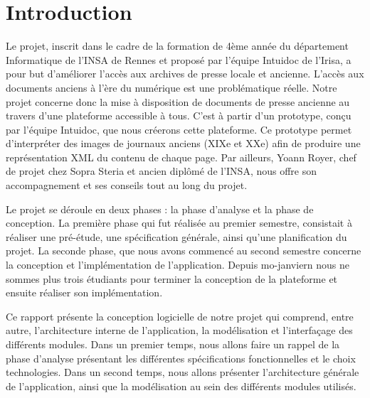 \section{Introduction}
\label{sec:intro}

Le projet, inscrit dans le cadre de la formation de 4ème année du département Informatique de l’INSA de Rennes et proposé par l’équipe Intuidoc de l’Irisa, a pour but d’améliorer l’accès aux archives de presse locale et ancienne. L’accès aux documents anciens à l’ère du numérique est une problématique réelle. Notre projet concerne donc la mise à disposition de documents de presse ancienne au travers d’une plateforme accessible à tous. C’est à partir d’un prototype, conçu par l’équipe Intuidoc, que nous créerons cette plateforme.
Ce prototype permet d’interpréter des images de journaux anciens (XIXe et XXe) afin de produire une représentation XML du contenu de chaque page. Par ailleurs, Yoann Royer, chef de projet chez Sopra Steria et ancien diplômé de l’INSA, nous offre son accompagnement et ses conseils tout au long du projet.

Le projet se déroule en deux phases : la phase d'analyse et la phase de conception. La première phase qui fut réalisée au premier semestre, consistait à réaliser une pré-étude, une spécification générale, ainsi qu'une planification  du projet. La seconde phase, que nous avons commencé au second semestre concerne la conception et l'implémentation de l'application. Depuis mo-janviern nous ne sommes plus trois étudiants pour terminer la conception de la plateforme et ensuite réaliser son implémentation.

Ce rapport présente la conception logicielle de notre projet qui comprend, entre autre, l'architecture interne de l'application, la modélisation et l'interfaçage des différents modules. Dans un premier temps, nous allons faire un rappel de la phase d'analyse présentant les différentes spécifications fonctionnelles et le choix technologies. Dans un second temps, nous allons présenter l'architecture générale de l'application, ainsi que la modélisation au sein des différents modules utilisés.
